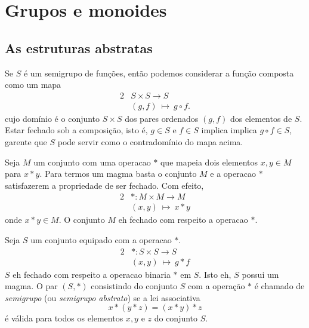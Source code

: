 \section{Grupos e monoides}
   \subsection{As estruturas abstratas}
      Se $S$ é um semigrupo de funções, então podemos considerar a função composta como um mapa
      \begin{alignat}{2}
         &S \times S \to S \nonumber\\
         &\left(g,f\right)\ \mapsto\ g \circ f.
         \nonumber
      \end{alignat}
      cujo domínio é o conjunto $S \times S$ dos pares ordenados $(g,f)$ dos elementos de $S$. Estar fechado sob a composição, isto é, $g\in S$ e $f\in S$ implica implica $g\circ f \in S$, garente que $S$ pode servir como o contradomínio do mapa acima.

      \begin{definition}[Magma]
         Seja $M$ um conjunto com uma operacao $*$ que mapeia dois elementos $x,y \in M$ para $x * y$. Para termos um magma basta o conjunto $M$ e a operacao $*$ satisfazerem a propriedade de ser fechado. Com efeito, 
         \begin{alignat}{2}
            &*: M \times M \to M \nonumber\\
            &\left(x,y\right)\ \mapsto\ x * y
            \nonumber
         \end{alignat}
         onde $x*y \in M$. O conjunto $M$ eh fechado com respeito a operacao $*$.
      \end{definition}
      \begin{definition}[Semigrupos]
         Seja $S$ um conjunto equipado com a operacao $*$.
         \begin{alignat}{2}
            &*:S \times S \to S \nonumber\\
            &\left(x,y\right)\ \mapsto\ g * f
            \nonumber
         \end{alignat}
         $S$ eh fechado com respeito a operacao binaria $*$ em $S$. Isto eh, $S$ possui um magma. O par $\left(S,* \right)$ consistindo do conjunto $S$ com a operação $*$ é chamado de \emph{semigrupo} (ou \emph{semigrupo abstrato}) se a lei associativa $$x * (y * z) = (x * y) * z$$ é válida para todos os elementos $x,y$ e $z$ do conjunto $S$.
      \end{definition}

